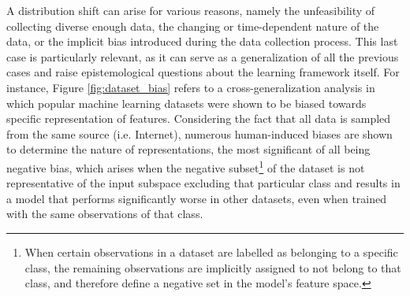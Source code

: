 A distribution shift can arise for various reasons, namely the 
unfeasibility of collecting diverse enough data, the changing or time-dependent
nature of the data, or the implicit bias
introduced during the data collection process. This last case
is particularly relevant, as it can serve as a generalization of all
the previous cases and raise epistemological questions
about the learning framework itself. For instance, 
Figure \ref{fig:dataset_bias} refers to a cross-generalization analysis in which popular
machine learning datasets were shown to be biased towards
specific representation of features. Considering the fact that all
data is sampled from the same source (i.e. Internet), 
numerous human-induced biases are shown to determine the 
nature of representations, the most significant of all being 
negative bias, which arises when the negative subset\footnote{
    When certain observations in a dataset are labelled as belonging 
    to a specific class, the remaining observations are implicitly
    assigned to not belong to that class, and therefore define a
    negative set in the model's feature space.
}
of the dataset is not representative of the input subspace 
excluding that  particular class and results in a model that performs 
significantly worse in other datasets, even when trained with 
the same observations of that class.\\

